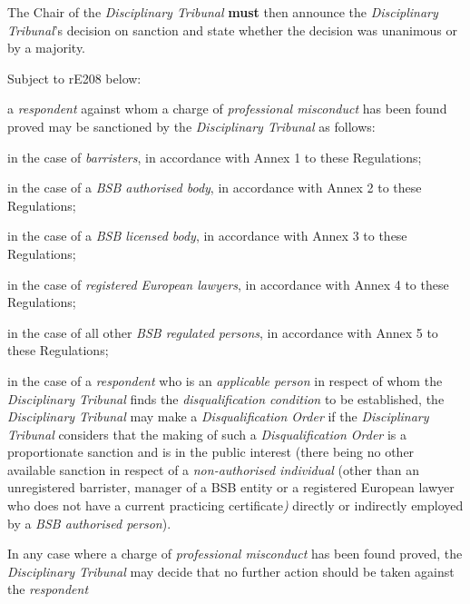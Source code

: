 \par
The Chair of the \emph{Disciplinary Tribunal}  \textcolor{myred}{\textbf{must}} then announce
the \emph{Disciplinary Tribunal}'s decision on sanction and state
whether the decision was unanimous or by a majority.\\
\par
Subject to rE208 below:\\\nl \item a \emph{respondent} against whom a charge of \emph{professional
misconduct} has been found proved may be sanctioned by
the \emph{Disciplinary Tribunal} as follows:
\al
\item in the case of \emph{barristers}, in accordance with Annex 1 to these
Regulations;\\
\item in the case of a \emph{BSB authorised body}, in accordance with Annex
2 to these Regulations;
\item in the case of a \emph{BSB licensed body}, in accordance with Annex 3
to these Regulations;\\
\item in the case of \emph{registered European lawyers}, in accordance with
Annex 4 to these Regulations;\\
\item in the case of all other \emph{BSB regulated persons}, in accordance
with Annex 5 to these Regulations;\la\item in the case of a \emph{respondent} who is an \emph{applicable
person} in respect of whom the \emph{Disciplinary Tribunal} finds
the \emph{disqualification condition} to be established,
the \emph{Disciplinary Tribunal} may make a \emph{Disqualification
Order} if the \emph{Disciplinary Tribunal} considers that the making of
such a \emph{Disqualification Order} is a proportionate sanction and is
in the public interest (there being no other available sanction in
respect of a \emph{non-authorised individual }(other than an
unregistered barrister, manager of a BSB entity or a registered European
lawyer who does not have a current practicing
certificate\emph{)} directly or indirectly employed by a \emph{BSB
authorised person}).\ln
{}\par
In any case where a charge of \emph{professional misconduct} has been
found proved, the \emph{Disciplinary Tribunal} may decide that no
further action should be taken against the \emph{respondent}\par
{}\par
